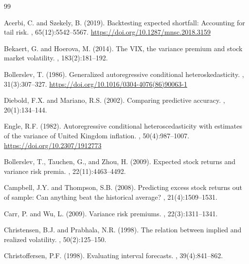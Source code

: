 \documentclass[12pt,a4paper]{article}
\begin{document}
\begin{thebibliography}{99}

Acerbi, C. and Szekely, B. (2019).
\newblock Backtesting expected shortfall: Accounting for tail risk.
, 65(12):5542--5567.
\newblock \url{https://doi.org/10.1287/mnsc.2018.3159}


Bekaert, G. and Hoerova, M. (2014).
\newblock The VIX, the variance premium and stock market volatility.
, 183(2):181--192.

Bollerslev, T. (1986).
\newblock Generalized autoregressive conditional heteroskedasticity.
, 31(3):307--327.
\newblock \url{https://doi.org/10.1016/0304-4076(86)90063-1}

Diebold, F.X. and Mariano, R.S. (2002).
\newblock Comparing predictive accuracy.
, 20(1):134--144.

Engle, R.F. (1982).
\newblock Autoregressive conditional heteroscedasticity with estimates of the variance of United Kingdom inflation.
, 50(4):987--1007.
\newblock \url{https://doi.org/10.2307/1912773}

Bollerslev, T., Tauchen, G., and Zhou, H. (2009).
\newblock Expected stock returns and variance risk premia.
, 22(11):4463--4492.

Campbell, J.Y. and Thompson, S.B. (2008).
\newblock Predicting excess stock returns out of sample: Can anything beat the historical average?
, 21(4):1509--1531.

Carr, P. and Wu, L. (2009).
\newblock Variance risk premiums.
, 22(3):1311--1341.

Christensen, B.J. and Prabhala, N.R. (1998).
\newblock The relation between implied and realized volatility.
, 50(2):125--150.

Christoffersen, P.F. (1998).
\newblock Evaluating interval forecasts.
, 39(4):841--862.


\end{thebibliography}
\end{document}
